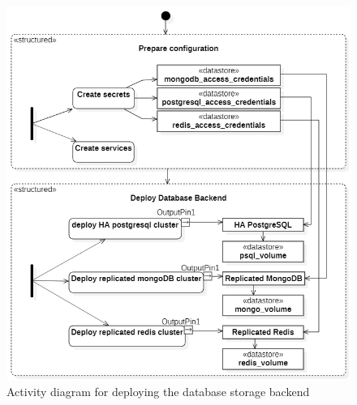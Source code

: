 \begin{figure}[H]\centering
\includegraphics[width=1.0\textwidth,angle=00]{assets/f35.png}
\caption{Activity diagram for deploying the database storage backend}
\label{fig:Activity diagram for deploying the database storage backend}
\end{figure}


